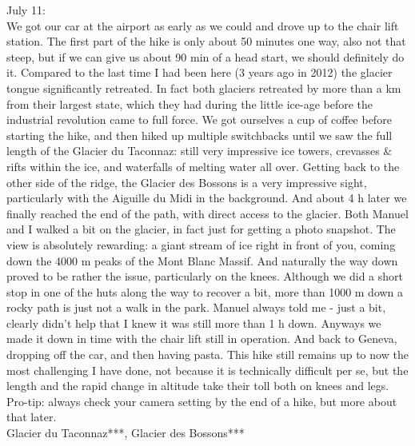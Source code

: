 July 11:\\
We got our car at the airport as early as we could and drove up to the chair lift station. The first part of the hike is only about 50 minutes one way, also not that steep, but if we can give us about 90 min of a head start, we should definitely do it. Compared to the last time I had been here (3 years ago in 2012) the glacier tongue significantly retreated. In fact both glaciers retreated by more than a km from their largest state, which they had during the little ice-age before the industrial revolution came to full force. We got ourselves a cup of coffee before starting the hike, and then hiked up multiple switchbacks until we saw the full length of the Glacier du Taconnaz: still very impressive ice towers, crevasses \& rifts within the ice, and waterfalls of melting water all over. Getting back to the other side of the ridge, the Glacier des Bossons is a very impressive sight, particularly with the Aiguille du Midi in the background. And about 4 h later we finally reached the end of the path, with direct access to the glacier. Both Manuel and I walked a bit on the glacier, in fact just for getting a photo snapshot. The view is absolutely rewarding: a giant stream of ice right in front of you, coming down the 4000 m peaks of the Mont Blanc Massif. And naturally the way down proved to be rather the issue, particularly on the knees. Although we did a short stop in one of the huts along the way to recover a bit, more than 1000 m down a rocky path is just not a walk in the park. Manuel always told me - just a bit, clearly didn't help that I knew it was still more than 1 h down. Anyways we made it down in time with the chair lift still in operation. And back to Geneva, dropping off the car, and then having pasta. This hike still remains up to now the most challenging I have done, not because it is technically difficult per se, but the length and the rapid change in altitude take their toll both on knees and legs. Pro-tip: always check your camera setting by the end of a hike, but more about that later.\\

Glacier du Taconnaz***, Glacier des Bossons***


